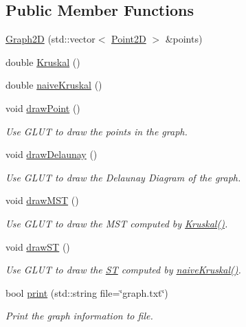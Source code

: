 \subsection*{Public Member Functions}
\begin{DoxyCompactItemize}
\item 
\hyperlink{classcmst_1_1_graph2_d_a36cf583f9e2e59da2bed94c8569914d2}{Graph2D} (std::vector$<$ \hyperlink{classcmst_1_1_point2_d}{Point2D} $>$ \&points)
\item 
double \hyperlink{classcmst_1_1_graph2_d_a034d2d37b2d106c0e25d7ad7bc67907e}{Kruskal} ()
\item 
double \hyperlink{classcmst_1_1_graph2_d_af0db14845e80799be1d4fb15ca230110}{naiveKruskal} ()
\item 
void \hyperlink{classcmst_1_1_graph2_d_affec250ee22a067a28127b46ce976b90}{drawPoint} ()
\begin{DoxyCompactList}\small\item\em Use GLUT to draw the points in the graph. \end{DoxyCompactList}\item 
void \hyperlink{classcmst_1_1_graph2_d_a2c4ed2ccd1fffc94c636929e531c4e3e}{drawDelaunay} ()
\begin{DoxyCompactList}\small\item\em Use GLUT to draw the Delaunay Diagram of the graph. \end{DoxyCompactList}\item 
void \hyperlink{classcmst_1_1_graph2_d_a96e388b819b351c8564eed9aecf58f7d}{drawMST} ()
\begin{DoxyCompactList}\small\item\em Use GLUT to draw the MST computed by \hyperlink{classcmst_1_1_graph2_d_a034d2d37b2d106c0e25d7ad7bc67907e}{Kruskal()}. \end{DoxyCompactList}\item 
void \hyperlink{classcmst_1_1_graph2_d_aebccee0b43539e658029a6f531ee1b0e}{drawST} ()
\begin{DoxyCompactList}\small\item\em Use GLUT to draw the \hyperlink{structcmst_1_1_graph2_d_1_1_s_t}{ST} computed by \hyperlink{classcmst_1_1_graph2_d_af0db14845e80799be1d4fb15ca230110}{naiveKruskal()}. \end{DoxyCompactList}\item 
bool \hyperlink{classcmst_1_1_graph2_d_a0e0bafdd08a942ef01c66768b5021f09}{print} (std::string file=\char`\"{}graph.txt\char`\"{})
\begin{DoxyCompactList}\small\item\em Print the graph information to file. \end{DoxyCompactList}\item 

\end{DoxyCompactItemize}
